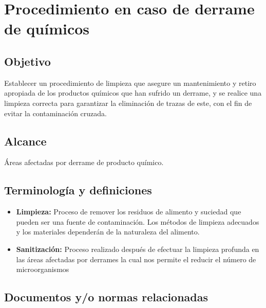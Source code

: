 \renewcommand{\MenorVer}{0}
\renewcommand{\MayorVer}{2}
\renewcommand{\Codigo}{HYS-22-IT}
\renewcommand{\FechaPub}{2023--01}
\renewcommand{\Titulo}{Procedimiento en caso de derrame de químicos}

\section{\Titulo}

\subsection{Objetivo}

Establecer un procedimiento de limpieza que asegure un mantenimiento y retiro apropiada de los productos químicos que han sufrido un derrame, y se realice una limpieza correcta para garantizar la eliminación de trazas de este, con el fin de evitar la contaminación cruzada.

\subsection{Alcance}

Áreas afectadas por derrame de producto químico.

\subsection{Terminología y definiciones}

\begin{itemize}
	\item \textbf{Limpieza:} Proceso de remover los residuos de alimento y suciedad que pueden ser una fuente de contaminación. Los métodos de limpieza adecuados y los materiales dependerán de la naturaleza del alimento.
	\item \textbf{Sanitización:} Proceso realizado después de efectuar la limpieza profunda en las áreas afectadas por derrames la cual nos permite el reducir el número de microorganismos
\end{itemize}

\subsection{Documentos y/o normas relacionadas}

